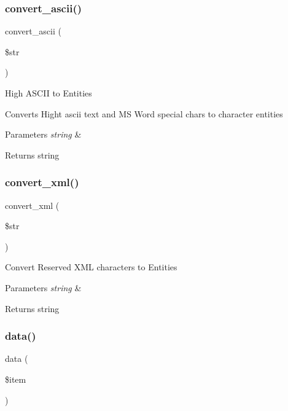 \subsubsection{\texorpdfstring{convert\+\_\+ascii()}{convert\_ascii()}}
{\footnotesize\ttfamily convert\+\_\+ascii (\begin{DoxyParamCaption}\item[{}]{\$str }\end{DoxyParamCaption})}

High A\+S\+C\+II to Entities

Converts Hight ascii text and MS Word special chars to character entities


\begin{DoxyParams}{Parameters}
{\em string} & \\
\hline
\end{DoxyParams}
\begin{DoxyReturn}{Returns}
string 
\end{DoxyReturn}
\mbox{\label{class_c_i___trackback_a1ec67af2037561b65ffe49b59727cb53}} 
\subsubsection{\texorpdfstring{convert\+\_\+xml()}{convert\_xml()}}
{\footnotesize\ttfamily convert\+\_\+xml (\begin{DoxyParamCaption}\item[{}]{\$str }\end{DoxyParamCaption})}

Convert Reserved X\+ML characters to Entities


\begin{DoxyParams}{Parameters}
{\em string} & \\
\hline
\end{DoxyParams}
\begin{DoxyReturn}{Returns}
string 
\end{DoxyReturn}
\mbox{\label{class_c_i___trackback_a4d04a7a984a4bcc71e27be87706f393c}} 
\subsubsection{\texorpdfstring{data()}{data()}}
{\footnotesize\ttfamily data (\begin{DoxyParamCaption}\item[{}]{\$item }\end{DoxyParamCaption})}

